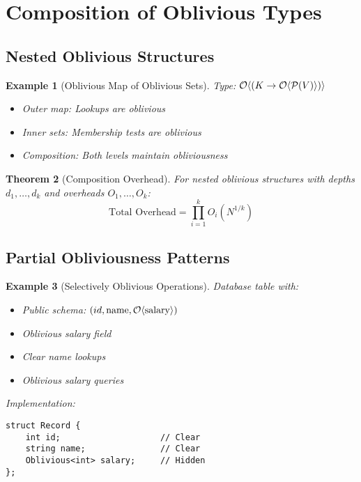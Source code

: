 \documentclass[11pt,final,hidelinks]{article}
\newtheorem{theorem}{Theorem}[section]
\newtheorem{example}[theorem]{Example}
\begin{document}
\section{Composition of Oblivious Types}

\subsection{Nested Oblivious Structures}

\begin{example}[Oblivious Map of Oblivious Sets]
Type: $\mathcal{O}\langle (K \to \mathcal{O}\langle \mathcal{P}(V) \rangle) \rangle$
\begin{itemize}
    \item Outer map: Lookups are oblivious
    \item Inner sets: Membership tests are oblivious
    \item Composition: Both levels maintain obliviousness
\end{itemize}
\end{example}

\begin{theorem}[Composition Overhead]
For nested oblivious structures with depths $d_1, \ldots, d_k$ and overheads $O_1, \ldots, O_k$:
\begin{equation}
\text{Total Overhead} = \prod_{i=1}^k O_i(N^{1/k})
\end{equation}
\end{theorem}

\subsection{Partial Obliviousness Patterns}

\begin{example}[Selectively Oblivious Operations]
Database table with:
\begin{itemize}
    \item Public schema: $(id, \text{name}, \mathcal{O}\langle \text{salary} \rangle)$
    \item Oblivious salary field
    \item Clear name lookups
    \item Oblivious salary queries
\end{itemize}
Implementation:
\begin{verbatim}
struct Record {
    int id;                    // Clear
    string name;               // Clear
    Oblivious<int> salary;     // Hidden
};
\end{verbatim}
\end{example}
\end{document}

